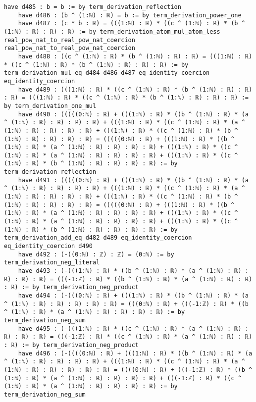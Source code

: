\documentclass{article}
\begin{document}
\begin{tcolorbox}[colback=white!10, width=\linewidth]
\begin{lstlisting}[language=Lean4]
    have d485 : b = b := by term_derivation_reflection
    have d486 : (b ^ (1:ℕ) : ℝ) = b := by term_derivation_power_one
    have d487 : (c * b : ℝ) = (((1:ℕ) : ℝ) * ((c ^ (1:ℕ) : ℝ) * (b ^ (1:ℕ) : ℝ) : ℝ) : ℝ) := by term_derivation_atom_mul_atom_less real_pow_nat_to_real_pow_nat_coercion real_pow_nat_to_real_pow_nat_coercion
    have d488 : ((c ^ (1:ℕ) : ℝ) * (b ^ (1:ℕ) : ℝ) : ℝ) = (((1:ℕ) : ℝ) * ((c ^ (1:ℕ) : ℝ) * (b ^ (1:ℕ) : ℝ) : ℝ) : ℝ) := by term_derivation_mul_eq d484 d486 d487 eq_identity_coercion eq_identity_coercion
    have d489 : (((1:ℕ) : ℝ) * ((c ^ (1:ℕ) : ℝ) * (b ^ (1:ℕ) : ℝ) : ℝ) : ℝ) = (((1:ℕ) : ℝ) * ((c ^ (1:ℕ) : ℝ) * (b ^ (1:ℕ) : ℝ) : ℝ) : ℝ) := by term_derivation_one_mul
    have d490 : (((((0:ℕ) : ℝ) + (((1:ℕ) : ℝ) * ((b ^ (1:ℕ) : ℝ) * (a ^ (1:ℕ) : ℝ) : ℝ) : ℝ) : ℝ) + (((1:ℕ) : ℝ) * ((c ^ (1:ℕ) : ℝ) * (a ^ (1:ℕ) : ℝ) : ℝ) : ℝ) : ℝ) + (((1:ℕ) : ℝ) * ((c ^ (1:ℕ) : ℝ) * (b ^ (1:ℕ) : ℝ) : ℝ) : ℝ) : ℝ) = (((((0:ℕ) : ℝ) + (((1:ℕ) : ℝ) * ((b ^ (1:ℕ) : ℝ) * (a ^ (1:ℕ) : ℝ) : ℝ) : ℝ) : ℝ) + (((1:ℕ) : ℝ) * ((c ^ (1:ℕ) : ℝ) * (a ^ (1:ℕ) : ℝ) : ℝ) : ℝ) : ℝ) + (((1:ℕ) : ℝ) * ((c ^ (1:ℕ) : ℝ) * (b ^ (1:ℕ) : ℝ) : ℝ) : ℝ) : ℝ) := by term_derivation_reflection
    have d491 : (((((0:ℕ) : ℝ) + (((1:ℕ) : ℝ) * ((b ^ (1:ℕ) : ℝ) * (a ^ (1:ℕ) : ℝ) : ℝ) : ℝ) : ℝ) + (((1:ℕ) : ℝ) * ((c ^ (1:ℕ) : ℝ) * (a ^ (1:ℕ) : ℝ) : ℝ) : ℝ) : ℝ) + (((1:ℕ) : ℝ) * ((c ^ (1:ℕ) : ℝ) * (b ^ (1:ℕ) : ℝ) : ℝ) : ℝ) : ℝ) = (((((0:ℕ) : ℝ) + (((1:ℕ) : ℝ) * ((b ^ (1:ℕ) : ℝ) * (a ^ (1:ℕ) : ℝ) : ℝ) : ℝ) : ℝ) + (((1:ℕ) : ℝ) * ((c ^ (1:ℕ) : ℝ) * (a ^ (1:ℕ) : ℝ) : ℝ) : ℝ) : ℝ) + (((1:ℕ) : ℝ) * ((c ^ (1:ℕ) : ℝ) * (b ^ (1:ℕ) : ℝ) : ℝ) : ℝ) : ℝ) := by term_derivation_add_eq d482 d489 eq_identity_coercion eq_identity_coercion d490
    have d492 : (-((0:ℕ) : ℤ) : ℤ) = (0:ℕ) := by term_derivation_neg_literal
    have d493 : (-(((1:ℕ) : ℝ) * ((b ^ (1:ℕ) : ℝ) * (a ^ (1:ℕ) : ℝ) : ℝ) : ℝ) : ℝ) = (((-1:ℤ) : ℝ) * ((b ^ (1:ℕ) : ℝ) * (a ^ (1:ℕ) : ℝ) : ℝ) : ℝ) := by term_derivation_neg_product
    have d494 : (-(((0:ℕ) : ℝ) + (((1:ℕ) : ℝ) * ((b ^ (1:ℕ) : ℝ) * (a ^ (1:ℕ) : ℝ) : ℝ) : ℝ) : ℝ) : ℝ) = (((0:ℕ) : ℝ) + (((-1:ℤ) : ℝ) * ((b ^ (1:ℕ) : ℝ) * (a ^ (1:ℕ) : ℝ) : ℝ) : ℝ) : ℝ) := by term_derivation_neg_sum
    have d495 : (-(((1:ℕ) : ℝ) * ((c ^ (1:ℕ) : ℝ) * (a ^ (1:ℕ) : ℝ) : ℝ) : ℝ) : ℝ) = (((-1:ℤ) : ℝ) * ((c ^ (1:ℕ) : ℝ) * (a ^ (1:ℕ) : ℝ) : ℝ) : ℝ) := by term_derivation_neg_product
    have d496 : (-((((0:ℕ) : ℝ) + (((1:ℕ) : ℝ) * ((b ^ (1:ℕ) : ℝ) * (a ^ (1:ℕ) : ℝ) : ℝ) : ℝ) : ℝ) + (((1:ℕ) : ℝ) * ((c ^ (1:ℕ) : ℝ) * (a ^ (1:ℕ) : ℝ) : ℝ) : ℝ) : ℝ) : ℝ) = ((((0:ℕ) : ℝ) + (((-1:ℤ) : ℝ) * ((b ^ (1:ℕ) : ℝ) * (a ^ (1:ℕ) : ℝ) : ℝ) : ℝ) : ℝ) + (((-1:ℤ) : ℝ) * ((c ^ (1:ℕ) : ℝ) * (a ^ (1:ℕ) : ℝ) : ℝ) : ℝ) : ℝ) := by term_derivation_neg_sum

\end{lstlisting}
\end{tcolorbox}
\end{document}
